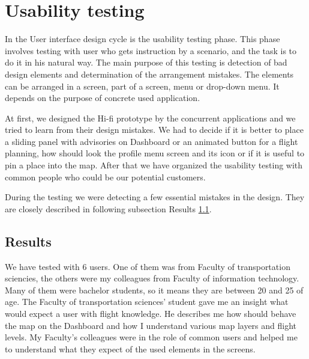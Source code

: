 \section{Usability testing}\label{sec:usability-testing}
In the User interface design cycle is the usability testing phase.
This phase involves testing with user who gets instruction by a scenario, and the task is to do it in his natural way.
The main purpose of this testing is detection of bad design elements and determination of the arrangement mistakes.
The elements can be arranged in a screen, part of a screen, menu or drop-down menu.
It depends on the purpose of concrete used application.

At first, we designed the Hi-fi prototype by the concurrent applications and we tried to learn from their design mistakes.
We had to decide if it is better to place a sliding panel with advisories on Dashboard or an animated button for a flight planning, how should look the profile menu screen and its icon or if it is useful to pin a place into the map.
After that we have organized the usability testing with common people who could be our potential customers.

During the testing we were detecting a few essential mistakes in the design.
They are closely described in following subsection Results \ref{subsec:results}.

\subsection{Results}\label{subsec:results}
We have tested with 6 users.
One of them was from Faculty of transportation sciencies, the others were my colleagues from Faculty of information technology.
Many of them were bachelor students, so it means they are between 20 and 25 of age.
The Faculty of transportation sciences' student gave me an insight what would expect a user with flight knowledge.
He describes me how should behave the map on the Dashboard and how I understand various map layers and flight levels.
My Faculty's colleagues were in the role of common users and helped me to understand what they expect of the used elements in the screens.

